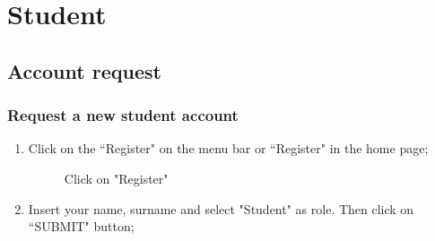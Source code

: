 \documentclass[ManualeUtente]{subfiles}
\begin{document}
\chapter{Student}
\section{Account request}
\subsection{Request a new student account}
\begin{enumerate}
	\item Click on the \textquotedblleft Register" on the menu bar or \textquotedblleft Register" in the home page;
	\begin{figure}[H]
		\centering
		\caption{Click on "Register"}
		\label{fig:Click on "Register"}
	\end{figure}
\newpage
	\item Insert your name, surname and select "Student" as role. Then click on \textquotedblleft SUBMIT" button;
	\begin{figure}[H]
		\centering

\end{figure}
\end{enumerate}
\end{document}

